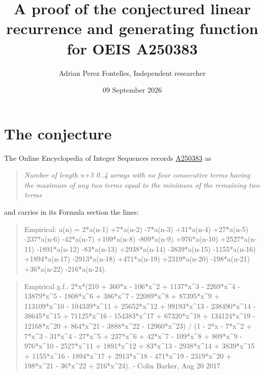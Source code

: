 \documentclass[11pt]{article}
\title{A proof of the conjectured linear recurrence and generating function for OEIS A250383}
\author{Adrian Perez Fontelles, Independent researcher}
\date{09 September 2026}
\theoremstyle{definition}
\begin{document}
\maketitle
\section{The conjecture}

The Online Encyclopedia of Integer Sequences records \href{https://oeis.org/A250383}{A250383} as

\begin{quote}\itshape Number of length n+3 0..4 arrays with no four consecutive terms having the maximum of any two terms equal to the minimum of the remaining two terms\end{quote}

and carries in its Formula section the lines:

\begin{quote}\ttfamily Empirical: a(n) = 2*a(n-1) +7*a(n-2) -7*a(n-3) +31*a(n-4) +27*a(n-5) -237*a(n-6) -42*a(n-7) +109*a(n-8) -809*a(n-9) +976*a(n-10) +2527*a(n-11) -1891*a(n-12) -83*a(n-13) +2938*a(n-14) -3839*a(n-15) -1155*a(n-16) +1894*a(n-17) -2913*a(n-18) +471*a(n-19) +2319*a(n-20) -198*a(n-21) +36*a(n-22) -216*a(n-24).\end{quote}

\begin{quote}\ttfamily Empirical g.f.: 2*x*(210 + 360*x - 106*x\textasciicircum{}2 + 1137*x\textasciicircum{}3 - 2269*x\textasciicircum{}4 - 13879*x\textasciicircum{}5 - 1808*x\textasciicircum{}6 + 386*x\textasciicircum{}7 - 22089*x\textasciicircum{}8 + 87395*x\textasciicircum{}9 + 113109*x\textasciicircum{}10 - 104339*x\textasciicircum{}11 + 25652*x\textasciicircum{}12 + 99193*x\textasciicircum{}13 - 238490*x\textasciicircum{}14 - 38645*x\textasciicircum{}15 + 71125*x\textasciicircum{}16 - 154383*x\textasciicircum{}17 + 67320*x\textasciicircum{}18 + 134124*x\textasciicircum{}19 - 12168*x\textasciicircum{}20 + 864*x\textasciicircum{}21 - 3888*x\textasciicircum{}22 - 12960*x\textasciicircum{}23) / (1 - 2*x - 7*x\textasciicircum{}2 + 7*x\textasciicircum{}3 - 31*x\textasciicircum{}4 - 27*x\textasciicircum{}5 + 237*x\textasciicircum{}6 + 42*x\textasciicircum{}7 - 109*x\textasciicircum{}8 + 809*x\textasciicircum{}9 - 976*x\textasciicircum{}10 - 2527*x\textasciicircum{}11 + 1891*x\textasciicircum{}12 + 83*x\textasciicircum{}13 - 2938*x\textasciicircum{}14 + 3839*x\textasciicircum{}15 + 1155*x\textasciicircum{}16 - 1894*x\textasciicircum{}17 + 2913*x\textasciicircum{}18 - 471*x\textasciicircum{}19 - 2319*x\textasciicircum{}20 + 198*x\textasciicircum{}21 - 36*x\textasciicircum{}22 + 216*x\textasciicircum{}24). - Colin Barker, Aug 20 2017\end{quote}
\end{document}
